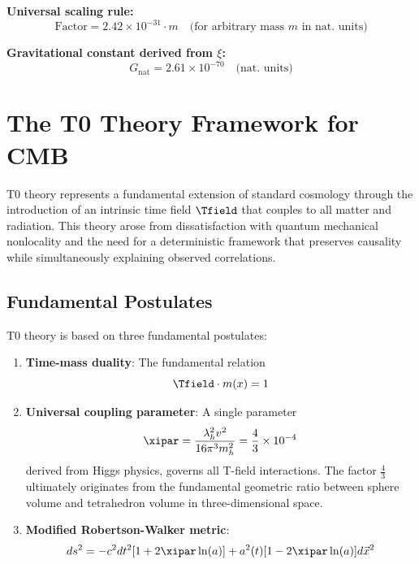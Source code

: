 	\textbf{Universal scaling rule:}
	\begin{equation}
		\text{Factor} = 2.42 \times 10^{-31} \cdot m \quad \text{(for arbitrary mass } m \text{ in nat. units)}
	\end{equation}
	
	\textbf{Gravitational constant derived from $\xi$:}
	\begin{equation}
		G_{\text{nat}} = 2.61 \times 10^{-70} \quad \text{(nat. units)}
	\end{equation}
	
	\section{The T0 Theory Framework for CMB}
	\label{sec:t0_framework}
	
	T0 theory represents a fundamental extension of standard cosmology through the introduction of an intrinsic time field $\Tfield$ that couples to all matter and radiation. This theory arose from dissatisfaction with quantum mechanical nonlocality and the need for a deterministic framework that preserves causality while simultaneously explaining observed correlations.
	
	\subsection{Fundamental Postulates}
	
	T0 theory is based on three fundamental postulates:
	
	\begin{enumerate}
		\item \textbf{Time-mass duality}: The fundamental relation
		\begin{equation}
			\Tfield \cdot m(x) = 1
			\label{eq:time_mass_duality}
		\end{equation}
		
		\item \textbf{Universal coupling parameter}: A single parameter
		\begin{equation}
			\xipar = \frac{\lambda_h^2 v^2}{16\pi^3 m_h^2} = \frac{4}{3} \times 10^{-4}
			\label{eq:xi_definition}
		\end{equation}
		derived from Higgs physics, governs all T-field interactions. The factor $\frac{4}{3}$ ultimately originates from the fundamental geometric ratio between sphere volume and tetrahedron volume in three-dimensional space.
		
		\item \textbf{Modified Robertson-Walker metric}:
		\begin{equation}
			ds^2 = -c^2dt^2[1 + 2\xipar\ln(a)] + a^2(t)[1 - 2\xipar\ln(a)]d\vec{x}^2
			\label{eq:modified_metric}
		\end{equation}
	\end{enumerate}
	
